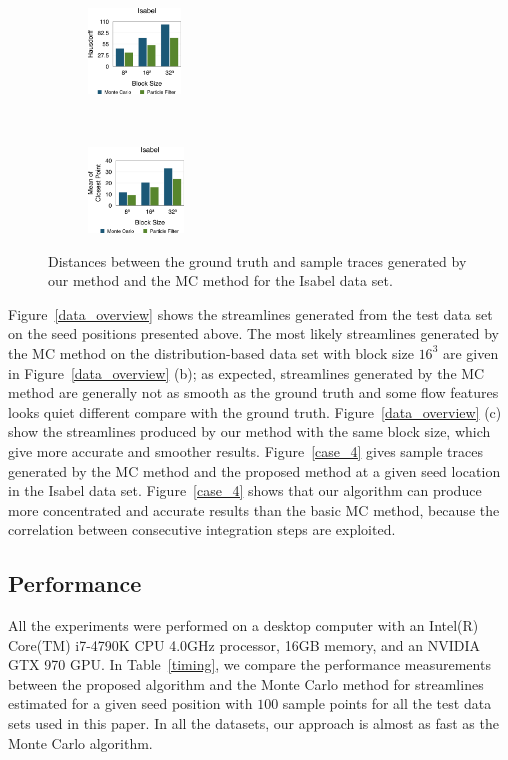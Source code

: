 \begin{figure}[!htb]
  \centering
  \begin{subfigure}[b]{0.24\textwidth}
    \centering
    \includegraphics[height=0.9in]{../figures/isabel_h.eps}
  \end{subfigure}~
  \begin{subfigure}[b]{0.24\textwidth}
    \centering
    \includegraphics[height=0.9in]{../figures/isabel_m.eps}
  \end{subfigure}
  \caption{Distances between the ground truth and sample traces generated by our method and the MC method for the Isabel data set.}
  \label{berror_r}
\end{figure}

Figure~\ref{data_overview} shows the streamlines generated from the test data set on the seed positions presented above. The most likely streamlines generated by the MC method on the distribution-based data set with block size $16^3$ are given in Figure~\ref{data_overview} (b); as expected, streamlines generated by the MC method are generally not as smooth as the ground truth and some flow features looks quiet different compare with the ground truth. Figure~\ref{data_overview} (c) show the streamlines produced by our method with the same block size, which give more accurate and smoother results. Figure~\ref{case_4} gives sample traces generated by the MC method and the proposed method at a given seed location in the Isabel data set. Figure~\ref{case_4} shows that our algorithm can produce more concentrated and accurate results than the basic MC method, because the correlation between consecutive integration steps are exploited.

\subsection{Performance}

All the experiments were performed on a desktop computer with an Intel(R) Core(TM) i7-4790K CPU 4.0GHz processor, 16GB memory, and an NVIDIA GTX 970 GPU. In Table~\ref{timing}, we compare the performance measurements between the proposed algorithm and the Monte Carlo method for streamlines estimated for a given seed position with $100$ sample points for all the test data sets used in this paper. In all the datasets, our approach is almost as fast as the Monte Carlo algorithm.

